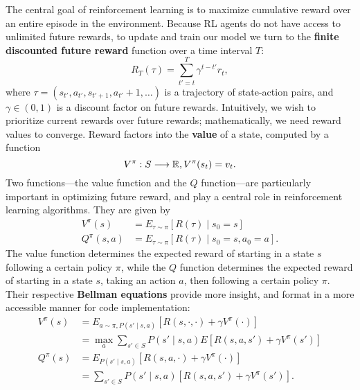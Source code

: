 \documentclass{article} %
\begin{document}
The central goal of reinforcement learning is to maximize cumulative reward over an entire episode
in the environment. Because RL agents do not have access to unlimited future rewards, to update and
train our model we turn to the \textbf{finite discounted future reward} function over a time
interval $T$: \[
  R_T(\tau)=\sum_{t'=t}^{T} \gamma^{t-t'}r_t
,\] where $\tau=(s_{t'}, a_{t'}, s_{t'+1}, a_{t'}+1, \ldots)$ is a trajectory of state-action pairs,
and $\gamma\in (0,1)$ is a discount factor on future rewards. Intuitively, we wish to prioritize
current rewards over future rewards; mathematically, we need reward values to converge. Reward
factors into the \textbf{value} of a state, computed by a function \[
  V^{\pi}:S\longrightarrow \mathbb{R}, V^{\pi}(s_t)=v_t
.\] Two functions---the value function and the $Q$ function---are particularly important in
optimizing future reward, and play a central role in reinforcement learning algorithms. They are
given by
\begin{align*}
  V^{\pi}(s)&=E_{\tau\sim \pi}[R(\tau)\mid s_0=s]\\
  Q^{\pi}(s, a)&=E_{\tau\sim \pi}[R(\tau)\mid s_0=s, a_0=a]
.\end{align*} The value function determines the expected reward of starting in a state
$s$ following a certain policy $\pi$, while the $Q$ function determines the expected reward of
starting in a state $s$, taking an action $a$, then following a certain policy $\pi$. Their
respective \textbf{Bellman equations} provide more insight, and format in a more accessible manner
for code implementation:
\begin{align*}
    V^{\pi}(s)&= E_{a\sim \pi, P(s'\mid s,a)}[R(s, \cdot , \cdot )+\gamma V^{\pi}(\cdot )] \\
              &= \max_a \sum_{s'\in S} P(s'\mid s,a)E[R(s,a,s')+\gamma V^\pi(s')] \\
    Q^\pi(s) &= E_{P(s'\mid s,a)}[R(s,a,\cdot)+\gamma V^{\pi}(\cdot )] \\
             &= \sum_{s'\in S} P(s'\mid s,a)[R(s,a,s')+\gamma V^\pi(s')]
.\end{align*}
\end{document}

